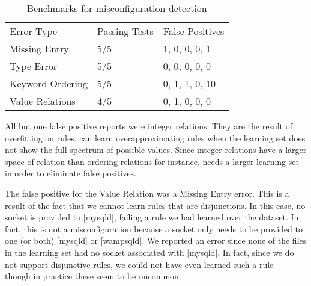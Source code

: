 \begin{table}[t]
\centering
\caption{Benchmarks for misconfiguration detection}
\label{table:res}
\begin{tabular}{l|l|l}
Error Type       & Passing Tests & False Positives  \\ \hhline{=|=|=}
Missing Entry    & 5/5           & 1, 0, 0, 0, 1        \\ \hline
Type Error       & 5/5           & 0, 0, 0, 0, 0          \\ \hline
Keyword Ordering & 5/5           & 0, 1, 1, 0, 10       \\ \hline
Value Relations  & 4/5           & 0, 1, 0, 0, 0        \\ 
\end{tabular}
\end{table}

All but one false positive reports were integer relations. They are the result of overfitting on rules.
\app can learn overapproximating rules when the learning set does not show the full spectrum of possible values.
Since integer relations have a larger space of relation than ordering relations for instance, \app needs a larger learning set in order to eliminate false positives.

The false positive for the Value Relation was a Missing Entry error.
This is a result of the fact that we cannot learn rules that are disjunctions.
In this case, no socket is provided to [mysqld], failing a rule we had learned over the dataset.
In fact, this is not a misconfiguration because a socket only needs to be provided to one (or both) [mysqld] or [wampsqld].
We reported an error since none of the files in the learning set had no socket associated with [mysqld].
In fact, since we do not support disjunctive rules, we could not have even learned such a rule - though in practice these seem to be uncommon.

